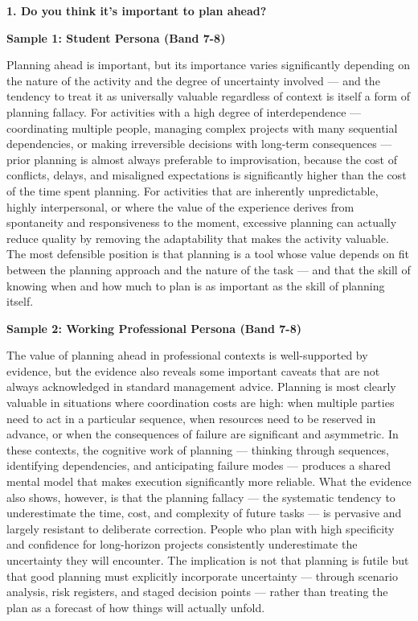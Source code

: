 \partthreeheader

\begin{ieltsquestion}
\textbf{1. Do you think it's important to plan ahead?}
\end{ieltsquestion}
\textbf{Sample 1: Student Persona (Band 7-8)}

Planning ahead is important, but its importance varies significantly depending on the nature of the activity and the degree of uncertainty involved — and the tendency to treat it as universally valuable regardless of context is itself a form of planning fallacy. For activities with a high degree of interdependence — coordinating multiple people, managing complex projects with many sequential dependencies, or making irreversible decisions with long-term consequences — prior planning is almost always preferable to improvisation, because the cost of conflicts, delays, and misaligned expectations is significantly higher than the cost of the time spent planning. For activities that are inherently unpredictable, highly interpersonal, or where the value of the experience derives from spontaneity and responsiveness to the moment, excessive planning can actually reduce quality by removing the adaptability that makes the activity valuable. The most defensible position is that planning is a tool whose value depends on fit between the planning approach and the nature of the task — and that the skill of knowing when and how much to plan is as important as the skill of planning itself.

\textbf{Sample 2: Working Professional Persona (Band 7-8)}

The value of planning ahead in professional contexts is well-supported by evidence, but the evidence also reveals some important caveats that are not always acknowledged in standard management advice. Planning is most clearly valuable in situations where coordination costs are high: when multiple parties need to act in a particular sequence, when resources need to be reserved in advance, or when the consequences of failure are significant and asymmetric. In these contexts, the cognitive work of planning — thinking through sequences, identifying dependencies, and anticipating failure modes — produces a shared mental model that makes execution significantly more reliable. What the evidence also shows, however, is that the planning fallacy — the systematic tendency to underestimate the time, cost, and complexity of future tasks — is pervasive and largely resistant to deliberate correction. People who plan with high specificity and confidence for long-horizon projects consistently underestimate the uncertainty they will encounter. The implication is not that planning is futile but that good planning must explicitly incorporate uncertainty — through scenario analysis, risk registers, and staged decision points — rather than treating the plan as a forecast of how things will actually unfold.


